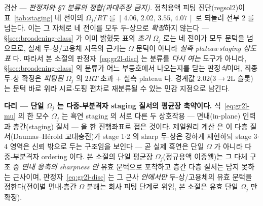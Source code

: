 \begin{verifybox}
검산 --- \emph{판정자와 §7 분류의 정합(과대주장 금지).} 정칙용액 피팅 진단(regsol2)이 표~\ref{tab:staging}
네 전이의 $\Omega_j/RT$ 를 $[\,4.06,\,2.02,\,3.55,\,4.07\,]$ 로 되돌려 전부 $2$ 를 넘는다. 이는 그 자체로 네
전이를 모두 두-상으로 \emph{확정}하지 않는다 --- \S\ref{sec:broadening-class} 가 이미 밝혔듯 표의 \emph{초기}
$\Omega_j$ 로는 네 전이가 모두 문턱을 넘으므로, 실제 두-상/고용체 지목의 근거는 $\Omega$ 문턱이 아니라
\emph{실측 plateau$\cdot$staging 상도표}\cite{dahn1991,ohzuku1993} 다. 따라서 본 소절의 판정자~\eqref{eq:gr2l-disc}
는 분류를 \emph{다시 여는} 도구가 아니라, \S\ref{sec:broadening-class} 의 분류가 어느 부등호에서 나오는지를
닫는 판정\emph{식}이며, 최종 두-상 확정은 \emph{피팅된} $\Omega_j$ 의 $2RT$ 초과 $+$ 실측 plateau 다. 경계값
$2.02$($3\!\to\!2\mathrm L$ 슬롯)는 문턱 바로 위라 시료$\cdot$도핑 편차로 재분류될 수 있는 민감 지점으로 남긴다.
\end{verifybox}

\begin{srcbox}
\textbf{다리 --- 단일 $\Omega_j$ 는 다중-부분격자 staging 질서의 평균장 축약이다.} 식~\eqref{eq:gr2l-mu} 의 한
모수 $\Omega_j$ 는 흑연 staging 의 서로 다른 두 상호작용 --- 면내(in-plane) 인력과 층간(staging) 질서 --- 을
한 진행좌표로 접은 것이다. 제일원리 계산\cite{persson2010b} 은 이 다층 질서(Daumas--H\'erold 교대충전)가
stage 1$\cdot$2 의 sharp 두-상은 강하게 재현하되 stage 3$\cdot$4 영역은 신뢰 밖으로 두는 구조임을 보인다 ---
곧 실제 흑연은 단일 $\Omega$ 가 아니라 다중-부분격자 ordering 이다. 본 소절의 단일 평균장 $\Omega_j$(정규용액
이중웰)는 그 다체 구조 중 \emph{면내 응축의 sharpness 만} 유효 문턱으로 포착하고 층간 다층 질서는 담지 못하는
근사이며, 판정자~\eqref{eq:gr2l-disc} 는 그 근사 \emph{안에서만} 두-상/고용체의 유효 문턱을 정한다(전이별
면내$\cdot$층간 $\Omega$ 분해는 회사 피팅 단계로 위임, 본 소절은 유효 단일 $\Omega_j$ 만 확정).
\end{srcbox}

